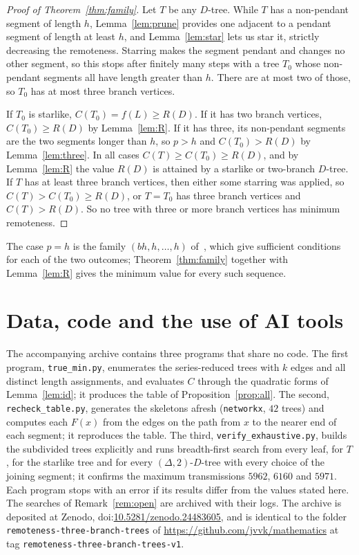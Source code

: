 \documentclass[11pt]{amsart}
\newcommand{\doi}[1]{doi:\href{https://doi.org/#1}{#1}}
\theoremstyle{definition}
\begin{document}
\begin{proof}[Proof of Theorem~\ref{thm:family}]
Let $T$ be any $D$-tree. While $T$ has a non-pendant segment of length $h$, Lemma~\ref{lem:prune} provides one adjacent
to a pendant segment of length at least $h$, and Lemma~\ref{lem:star} lets us star it, strictly decreasing the
remoteness. Starring makes the segment pendant and changes no other segment, so this stops after finitely many steps
with a tree $T_0$ whose non-pendant segments all have length greater than $h$. There are at most two of those, so $T_0$
has at most three branch vertices.

If $T_0$ is starlike, $C(T_0)=f(L)\ge R(D)$. If it has two branch vertices, $C(T_0)\ge R(D)$ by Lemma~\ref{lem:R}. If
it has three, its non-pendant segments are the two segments longer than $h$, so $p>h$ and $C(T_0)>R(D)$ by
Lemma~\ref{lem:three}. In all cases $C(T)\ge C(T_0)\ge R(D)$, and by Lemma~\ref{lem:R} the value $R(D)$ is attained by
a starlike or two-branch $D$-tree. If $T$ has at least three branch vertices, then either some starring was applied,
so $C(T)>C(T_0)\ge R(D)$, or $T=T_0$ has three branch vertices and $C(T)>R(D)$. So no tree with three or more branch
vertices has minimum remoteness.
\end{proof}

The case $p=h$ is the family $(bh,h,\dots,h)$ of~\cite[Theorem~4.2 and Corollary~4.3]{ADHM}, which give sufficient
conditions for each of the two outcomes; Theorem~\ref{thm:family} together with Lemma~\ref{lem:R} gives the minimum
value for every such sequence.

\section{Data, code and the use of AI tools}\label{sec:data}

The accompanying archive contains three programs that share no code. The first program, \texttt{true\_min.py}, enumerates the
series-reduced trees with $k$ edges and all distinct length assignments, and evaluates $C$ through the quadratic forms of
Lemma~\ref{lem:id}; it produces the table of Proposition~\ref{prop:all}. The second, \texttt{recheck\_table.py},
generates the skeletons afresh (\texttt{networkx}, $42$ trees) and computes each $F(x)$ from the edges on the path
from $x$ to the nearer end of each segment; it reproduces the table. The third, \texttt{verify\_exhaustive.py},
builds the subdivided trees explicitly and runs breadth-first search from every leaf, for $T$, for the starlike tree
and for every $(\Delta,2)$-$D$-tree with every choice of the joining segment; it confirms the maximum transmissions
$5962$, $6160$ and $5971$. Each program stops with an error if its results differ from the values stated here.
The searches of Remark~\ref{rem:open} are archived with their logs. The archive is deposited at Zenodo,
\doi{10.5281/zenodo.24483605}, and is identical to the folder \texttt{remoteness-three-branch-trees} of
\url{https://github.com/jvvk/mathematics} at tag \texttt{remoteness-three-branch-trees-v1}.
\end{document}
